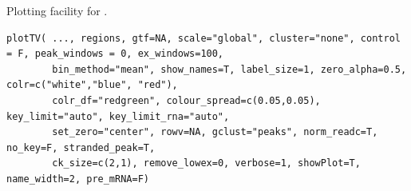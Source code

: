\documentclass[letterpaper]{book}
\begin{document}
%
\begin{Description}
Plotting facility for . 
\end{Description}
%
\begin{Usage}
\begin{verbatim}
plotTV( ..., regions, gtf=NA, scale="global", cluster="none", control = F, peak_windows = 0, ex_windows=100,
		bin_method="mean", show_names=T, label_size=1, zero_alpha=0.5, colr=c("white","blue", "red"), 
		colr_df="redgreen",	colour_spread=c(0.05,0.05), key_limit="auto", key_limit_rna="auto", 
		set_zero="center", rowv=NA,	gclust="peaks", norm_readc=T, no_key=F, stranded_peak=T, 
		ck_size=c(2,1), remove_lowex=0, verbose=1, showPlot=T, name_width=2, pre_mRNA=F)
\end{verbatim}
\end{Usage}
%
\end{document}

